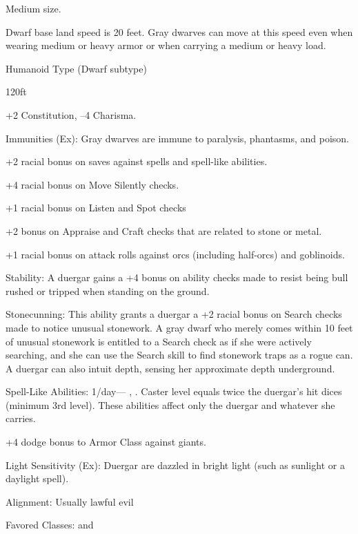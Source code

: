 \begin{multicols}{2}

\begin{itemize*}
\item Medium size.
\item Dwarf base land speed is 20 feet. Gray dwarves can move at this speed even when wearing medium or heavy armor or when carrying a medium or heavy load.
\item Humanoid Type (Dwarf subtype)
\item {} 120ft
\item +2 Constitution, –4 Charisma.
\item Immunities (Ex): Gray dwarves are immune to paralysis, phantasms, and poison.
\item  +2 racial bonus on saves against spells and spell-like abilities.
\item +4 racial bonus on Move Silently checks.
\item +1 racial bonus on Listen and Spot checks
\item +2 bonus on Appraise and Craft checks that are related to stone or metal.
\item +1 racial bonus on attack rolls against orcs (including half-orcs) and goblinoids.
\item Stability: A duergar gains a +4 bonus on ability checks made to resist being bull rushed or tripped when standing on the ground.
\item Stonecunning: This ability grants a duergar a +2 racial bonus on Search checks made to notice unusual stonework. A gray dwarf who merely comes within 10 feet of unusual stonework is entitled to a Search check as if she were actively searching, and she can use the Search skill to find stonework traps as a rogue can. A duergar can also intuit depth, sensing her approximate depth underground.
\item Spell-Like Abilities: 1/day— , . Caster level equals twice the duergar’s hit dices (minimum 3rd level). These abilities affect only the duergar and whatever she carries.
\item +4 dodge bonus to Armor Class against giants.
\item Light Sensitivity (Ex): Duergar are dazzled in bright light (such as sunlight or a daylight spell).
\item Alignment: Usually lawful evil
\item Favored Classes:  and 
\end{itemize*}


\end{multicols}
